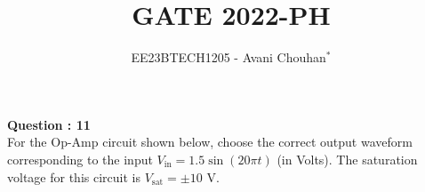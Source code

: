 \documentclass[journal,12pt,twocolumn]{IEEEtran}
\theoremstyle{remark}
\begin{document}

\vspace{3cm}

\title{GATE 2022-PH}
\author{EE23BTECH1205 - Avani Chouhan$^{*}$}
\maketitle
\newpage
\bigskip

\renewcommand{\thefigure}{\theenumi}
\renewcommand{\thetable}{\theenumi}

\vspace{3cm}
\textbf{Question : 11} \\
For the Op-Amp circuit shown below, choose the correct output waveform corresponding to the input \( V_{\text{in}} = 1.5 \sin(20 \pi t) \) (in Volts). The saturation voltage for this circuit is \( V_{\text{sat}} = \pm 10 \) V.
\begin{figure}[htb]
\centering
    
    \label{fig:1}
\end{figure}
\end{document}
